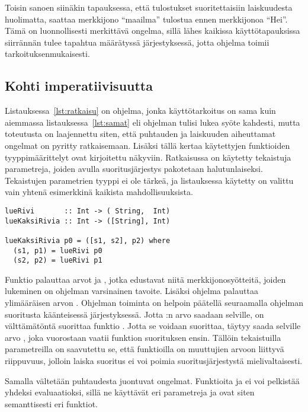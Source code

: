 \documentclass[finnish]{tktltiki2}
\begin{document}
Toisin sanoen siinäkin tapauksessa, että tulostukset suoritettaisiin laiskuudesta huolimatta,
saattaa merkkijono ``maailma'' tulostua ennen merkkijonoa ``Hei''. Tämä on luonnollisesti merkittävä
ongelma, sillä lähes kaikissa käyttötapauksissa siirrännän tulee tapahtua määrätyssä järjestyksessä,
jotta ohjelma toimii tarkoituksenmukaisesti.

\subsection{Kohti imperatiivisuutta}

Listauksessa~\ref{lst:ratkaisu} on ohjelma, jonka käyttötarkoitus on sama kuin aiemmassa
listauksessa~\ref{lst:samat} eli ohjelman tulisi lukea syöte kahdesti, mutta toteutusta on
laajennettu siten, että puhtauden ja laiskuuden aiheuttamat ongelmat on pyritty ratkaisemaan.
Lisäksi tällä kertaa käytettyjen funktioiden tyyppimäärittelyt ovat kirjoitettu näkyviin.
Ratkaisussa on käytetty tekaistuja parametreja, joiden avulla suoritusjärjestys pakotetaan
halutunlaiseksi. Tekaistujen parametrien tyyppi ei ole tärkeä, ja listauksessa käytetty 
on valittu vain yhtenä esimerkkinä kaikista mahdollisuuksista.

\begin{lstlisting}[float,label={lst:ratkaisu},caption={Suoritusjärjestys riippuvuuksien avulla}]
lueRivi       :: Int -> ( String,  Int)
lueKaksiRivia :: Int -> ([String], Int)

lueKaksiRivia p0 = ([s1, s2], p2) where
  (s1, p1) = lueRivi p0
  (s2, p2) = lueRivi p1
\end{lstlisting}

Funktio  palauttaa arvot  ja , jotka edustavat niitä
merkkijonosyötteitä, joiden lukeminen on ohjelman varsinainen tavoite. Lisäksi ohjelma palauttaa
ylimääräisen arvon . Ohjelman toiminta on helpoin päätellä seuraamalla ohjelman suoritusta
käänteisessä järjestyksessä. Jotta :n arvo saadaan selville, on välttämätöntä suorittaa
funktio . Jotta se voidaan suorittaa, täytyy saada selville arvo , joka
vuorostaan vaatii funktion  suorituksen ensin. Tällöin tekaistuilla parametreilla
on saavutettu se, että funktioilla  on muuttujien arvoon liittyvä riippuvuus, jolloin
laiska suoritus ei voi poimia suoritusjärjestystä mielivaltaisesti.

Samalla vältetään puhtaudesta juontuvat ongelmat. Funktioita  ja 
ei voi pelkistää yhdeksi evaluaatioksi, sillä ne käyttävät eri parametreja ja ovat siten
semanttisesti eri funktiot.
\end{document}
